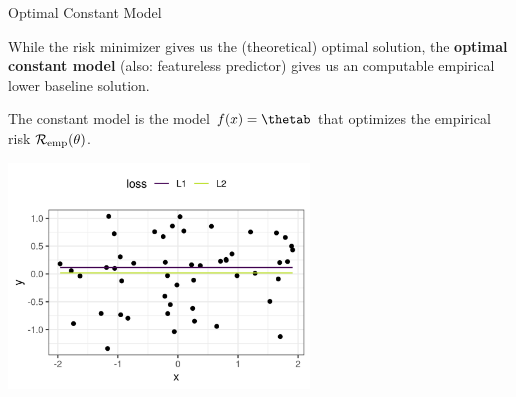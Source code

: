 \begin{vbframe}{Optimal Constant Model}

While the risk minimizer gives us the (theoretical) optimal solution, the \textbf{optimal constant model} (also: featureless predictor) gives us an computable empirical lower baseline solution.

\vspace*{0.2cm}

The constant model is the model $\fx = \thetab$ that optimizes the empirical risk $\mathcal{R}_{\text{emp}}(\theta)$.

\vspace*{-0.5cm}

\begin{center}
	\includegraphics[width = 0.6\textwidth]{figure/l1_vs_l2.png}
\end{center}

\end{vbframe}

